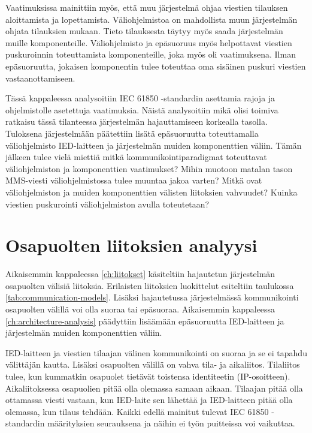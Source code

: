 Vaatimuksissa mainittiin myös, että muu järjestelmä ohjaa viestien tilauksen aloittamista ja lopettamista. Väliohjelmistoa on mahdollista muun järjestelmän ohjata tilauksien mukaan. Tieto tilauksesta täytyy myös saada järjestelmän muille komponenteille. Väliohjelmisto ja epäsuoruus myös helpottavat viestien puskuroinnin toteuttamista komponenteille, joka myös oli vaatimuksena. Ilman epäsuoruutta, jokaisen komponentin tulee toteuttaa oma sisäinen puskuri viestien vastaanottamiseen.

Tässä kappaleessa analysoitiin IEC 61850 -standardin asettamia rajoja ja ohjelmistolle asetettuja vaatimuksia. Näistä analysoitiin mikä olisi toimiva ratkaisu tässä tilanteessa järjestelmän hajauttamiseen korkealla tasolla. Tuloksena järjestelmään päätettiin lisätä epäsuoruutta toteuttamalla väliohjelmisto IED-laitteen ja järjestelmän muiden komponenttien väliin. Tämän jälkeen tulee vielä miettiä mitkä kommunikointiparadigmat toteuttavat väliohjelmiston ja komponenttien vaatimukset? Mihin muotoon matalan tason MMS-viesti väliohjelmistossa tulee muuntaa jakoa varten? Mitkä ovat väliohjelmiston ja muiden komponenttien välisten liitoksien vahvuudet? Kuinka viestien puskurointi väliohjelmiston avulla toteutetaan?


\section{Osapuolten liitoksien analyysi}
Aikaisemmin kappaleessa \ref{ch:liitokset} käsiteltiin hajautetun järjestelmän osapuolten välisiä liitoksia. Erilaisten liitoksien luokittelut esiteltiin taulukossa \ref{tab:communication-models}. Lisäksi hajautetussa järjestelmässä kommunikointi osapuolten välillä voi olla suoraa tai epäsuoraa. Aikaisemmin kappaleessa \ref{ch:architecture-analysis} päädyttiin lisäämään epäsuoruutta IED-laitteen ja järjestelmän muiden komponenttien väliin.

IED-laitteen ja viestien tilaajan välinen kommunikointi on suoraa ja se ei tapahdu välittäjän kautta. Lisäksi osapuolten välillä on vahva tila- ja aikaliitos. Tilaliitos tulee, kun kummatkin osapuolet tietävät toistensa identiteetin (IP-osoitteen). Aikaliitoksessa osapuolien pitää olla olemassa samaan aikaan. Tilaajan pitää olla ottamassa viesti vastaan, kun IED-laite sen lähettää ja IED-laitteen pitää olla olemassa, kun tilaus tehdään. Kaikki edellä mainitut tulevat IEC 61850 -standardin määrityksien seurauksena ja näihin ei työn puitteissa voi vaikuttaa.

